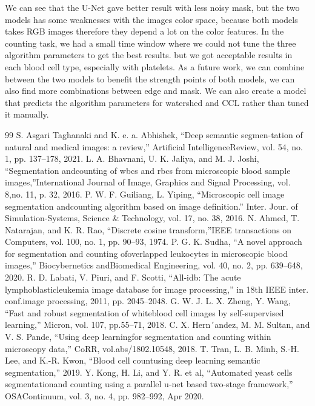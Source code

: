 \documentclass[conference]{IEEEtran}
\begin{document}
We can see that the U-Net gave better result with less noisy mask, but the two models has some weaknesses with the images color space, because both models takes RGB images therefore they depend a lot on the color features.
In the counting task, we had a small time window where we could not tune the three algorithm parameters to get the best results. but we got acceptable results in each blood cell type, especially with platelets.
As a future work, we can combine between the two models to benefit the strength points of both models, we can also find more combinations between edge and mask. We can also create a model that predicts the algorithm parameters for watershed and CCL rather than tuned it manually.


\begin{thebibliography}{99}
 S. Asgari Taghanaki and K. e. a. Abhishek, “Deep semantic segmen-tation of natural and medical images: a review,” Artificial IntelligenceReview, vol. 54, no. 1, pp. 137–178, 2021.
 L. A. Bhavnani, U. K. Jaliya, and M. J. Joshi, “Segmentation andcounting of wbcs and rbcs from microscopic blood sample images,”International Journal of Image, Graphics and Signal Processing, vol. 8,no. 11, p. 32, 2016.
 P. W. F. Guiliang, L. Yiping, “Microscopic cell image segmentation andcounting algorithm based on image definition.” Inter. Jour. of Simulation-Systems, Science & Technology, vol. 17, no. 38, 2016.
 N. Ahmed, T. Natarajan, and K. R. Rao, “Discrete cosine transform,”IEEE transactions on Computers, vol. 100, no. 1, pp. 90–93, 1974.
 P. G. K. Sudha, “A novel approach for segmentation and counting ofoverlapped leukocytes in microscopic blood images,” Biocybernetics andBiomedical Engineering, vol. 40, no. 2, pp. 639–648, 2020.
 R. D. Labati, V. Piuri, and F. Scotti, “All-idb: The acute lymphoblasticleukemia image database for image processing,” in 18th IEEE inter. conf.image processing, 2011, pp. 2045–2048.
 G. W. J. L. X. Zheng, Y. Wang, “Fast and robust segmentation of whiteblood cell images by self-supervised learning,” Micron, vol. 107, pp.55–71, 2018.
 C. X. Hern´andez, M. M. Sultan, and V. S. Pande, “Using deep learningfor segmentation and counting within microscopy data,” CoRR, vol.abs/1802.10548, 2018.
 T. Tran, L. B. Minh, S.-H. Lee, and K.-R. Kwon, “Blood cell countusing deep learning semantic segmentation,” 2019.
 Y. Kong, H. Li, and Y. R. et al, “Automated yeast cells segmentationand counting using a parallel u-net based two-stage framework,” OSAContinuum, vol. 3, no. 4, pp. 982–992, Apr 2020.

\end{thebibliography}
\end{document}
